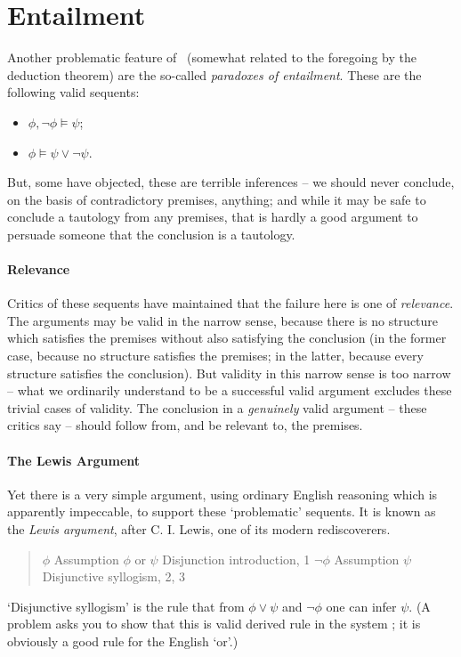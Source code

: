


\section{Entailment}

Another problematic feature of \lone\ (somewhat related to the foregoing by the deduction theorem) are the so-called \emph{paradoxes of entailment}. These are the following valid sequents: \begin{itemize}
	\item $\phi, \neg\phi \vDash \psi$;
	\item $\phi \vDash \psi \vee \neg \psi$.
\end{itemize}
But, some have objected, these are terrible inferences – we should never conclude, on the basis of contradictory premises, anything; and while it may be safe to conclude a tautology from any premises, that is hardly a good argument to persuade someone that the conclusion is a tautology. 

\paragraph{Relevance} Critics of these sequents have maintained that the failure here is one of \emph{relevance}. The arguments may be valid in the narrow sense, because there is no structure which satisfies the premises without also satisfying the conclusion (in the former case, because no structure satisfies the premises; in the latter, because every structure satisfies the conclusion). But validity in this narrow sense is too narrow – what we ordinarily understand to be a successful valid argument excludes these trivial cases of validity. The conclusion in a \emph{genuinely} valid argument – these critics say – should follow from, and be relevant to, the premises.

\paragraph{The Lewis Argument} Yet there is a very simple argument, using ordinary English reasoning which is apparently impeccable, to support these `problematic' sequents. It is known as the \emph{Lewis argument}, after C. I. Lewis, one of its modern rediscoverers. 
\begin{quote}
	\begin{exe}
	\ex $\phi$ \hfill Assumption
	\ex $\phi$ or $\psi$ \hfill Disjunction introduction, 1
	\ex $\neg \phi$ \hfill Assumption 
	\ex $\psi$ \hfill  Disjunctive syllogism, 2, 3
\end{exe}
\end{quote}
`Disjunctive syllogism' is the rule that from $\phi \vee \psi$ and $\neg \phi$ one can infer $\psi$. (A problem asks you to show that this is valid derived rule in the system \lone; it is obviously a good rule for the English `or'.) 

